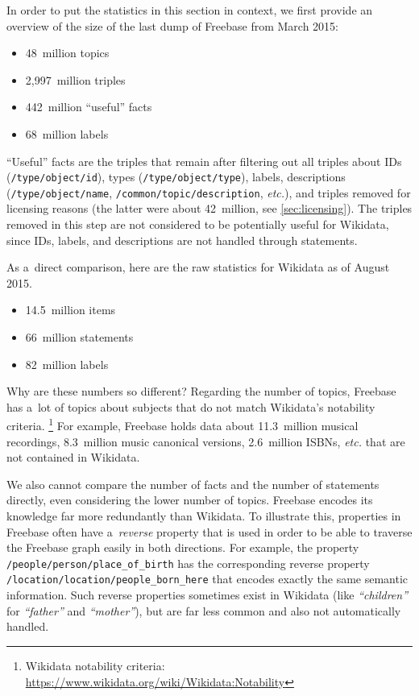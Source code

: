 \documentclass{acm_proc_article-sp}
\begin{document}
In order to put the statistics in this section in context,
we first provide an overview of the size of the last dump of Freebase
from March 2015:

\begin{itemize}
  \setlength\itemsep{0em}
  \item 48~million topics
  \item 2,997~million triples
  \item 442~million ``useful'' facts%
  \item 68~million labels
\end{itemize}

``Useful'' facts are the triples that remain 
after filtering out all triples about IDs (\texttt{/type/object/id}),
types \linebreak (\texttt{/type/object/type}), labels, descriptions \linebreak
(\texttt{/type/object/name},
\texttt{/common/topic/description}, \emph{etc.}), \linebreak and triples removed
for licensing reasons (the latter were about 42~million, see \autoref{sec:licensing}).
The triples removed in this step are not considered to be potentially useful for
Wikidata, since IDs, labels, and descriptions are not handled through statements.

As a~direct comparison, here are the raw statistics for Wikidata as of August 2015.

\begin{itemize}
    \setlength\itemsep{0em}
    \item 14.5~million items
    \item 66~million statements
    \item 82~million labels
\end{itemize}

Why are these numbers so different?
Regarding the number of topics, Freebase has a~lot of topics about subjects
that do not match Wikidata's notability criteria.%
\footnote{Wikidata notability criteria:
\url{https://www.wikidata.org/wiki/Wikidata:Notability}}
For example, Freebase holds data about 11.3~million musical recordings,
8.3~million music canonical versions, 2.6~million ISBNs, \emph{etc.} that are not contained in Wikidata.

We also cannot compare the number of facts and the number of statements directly,
even considering the lower number of topics.
Freebase encodes its knowledge far more redundantly than Wikidata.
To illustrate this, properties in Freebase often have a~\emph{reverse} property
that is used in order to be able to traverse the Freebase graph easily in both directions.
For example, the property \texttt{/people/person/place\_of\_birth} has the corresponding
reverse property \linebreak \texttt{/location/location/people\_born\_here}
that encodes exactly the same semantic information.
Such reverse properties sometimes exist in Wikidata
(like \textit{``children''} for \textit{``father''} and \textit{``mother''}),
but are far less common and also not automatically handled.
\end{document}
